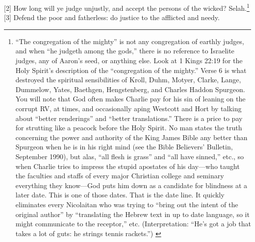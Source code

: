 [2] \textcolor[rgb]{0.00,0.00,1.00}{How long will ye judge unjustly, and accept the persons of the wicked? Selah.}\footnote{“The congregation of the mighty” is not any congregation of earthly judges, and
when “he judgeth among the gods,” there is no reference to Israelite judges, any of
Aaron’s seed, or anything else. Look at 1 Kings 22:19 for the Holy Spirit’s description
of the “congregation of the mighty.” Verse 6 is what destroyed the spiritual sensibilities of
Kroll, Duhm, Motyer, Clarke, Lange,
Dummelow, Yates, Baethgen, Hengstenberg,
and Charles Haddon Spurgeon. You will note
that God often makes Charlie pay for his sin
of leaning on the corrupt RV, at times, and
occasionally aping Westcott and Hort by
talking about “better renderings” and “better
translations.” There is a price to pay for
strutting like a peacock before the Holy Spirit.
No man states the truth concerning the power
and authority of the King James Bible any
better than Spurgeon when he is in his right
mind (see the Bible Believers’ Bulletin,
September 1990), but alas, “all flesh is
grass” and “all have sinned,” etc., so when
Charlie tries to impress the stupid apostates of
his day—who taught the faculties and staffs
of every major Christian college and seminary
everything they know—God puts him down
as a candidate for blindness at a later date.
This is one of those dates. That is the date line. It
quickly eliminates every Nicolaitan who was
trying to “bring out the intent of the original
author” by “translating the Hebrew text in
up to date language, so it might communicate
to the receptor,” etc. (Interpretation: “He’s
got a job that takes a lot of guts: he strings
tennis rackets.”) \cite{Ruckman1992Psalms}}
[3] \textcolor[rgb]{0.00,0.00,1.00}{Defend the poor and fatherless: do justice to the afflicted and needy.}
